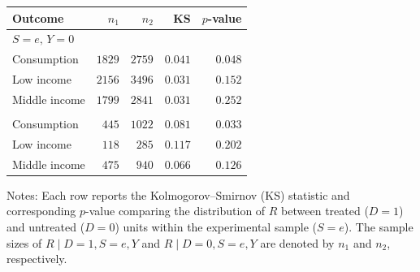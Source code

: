 \begin{threeparttable}
\begin{tabular}{lrrrr}
\toprule
Outcome & $n_1$ & $n_2$ & KS & $p$-value \\
\midrule
\multicolumn{5}{l}{$S=e,\, Y=0$}\\
\quad Consumption & $1829$ & $2759$ & $0.041$ & $0.048$ \\
\quad Low income & $2156$ & $3496$ & $0.031$ & $0.152$ \\
\quad Middle income & $1799$ & $2841$ & $0.031$ & $0.252$ \\
\addlinespace[0.6em]
\multicolumn{5}{l}{$S=e,\, Y=1$}\\
\quad Consumption & $445$ & $1022$ & $0.081$ & $0.033$ \\
\quad Low income & $118$ & $285$ & $0.117$ & $0.202$ \\
\quad Middle income & $475$ & $940$ & $0.066$ & $0.126$ \\
\bottomrule
\end{tabular}
\begin{tablenotes}[flushleft]
\small
\item Notes: Each row reports the Kolmogorov--Smirnov (KS) statistic and corresponding $p$-value comparing the distribution of $R$ between treated ($D=1$) and untreated ($D=0$) units within the experimental sample ($S=e$). The sample sizes of $R \mid D=1, S=e, Y$ and $R \mid D=0, S=e, Y$ are denoted by $n_1$ and $n_2$, respectively.
\end{tablenotes}
\end{threeparttable}
